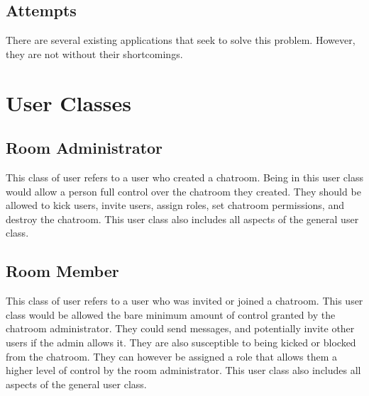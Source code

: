 \documentclass[11pt]{article}
\theoremstyle{plain}
\theoremstyle{definition}
\begin{document}
\subsection{Attempts}\label{sec:attempts}
There are several existing applications that seek to solve this problem. However, they are not without their shortcomings.

\setlength{\tabcolsep}{4pt} %

\section{User Classes}\label{sec:userclasses}

\subsection{Room Administrator}
This class of user refers to a user who created a chatroom. Being in this user class would allow a person full control over the chatroom they created. They should be allowed to kick users, invite users, assign roles, set chatroom permissions, and destroy the chatroom. This user class also includes all aspects of the general user class. 
\subsection{Room Member}
This class of user refers to a user who was invited or joined a chatroom. This user class would be allowed the bare minimum amount of control granted by the chatroom administrator. They could send messages, and potentially invite other users if the admin allows it. They are also susceptible to being kicked or blocked from the chatroom. They can however be assigned a role that allows them a higher level of control by the room administrator.  This user class also includes all aspects of the general user class. 
\end{document}
